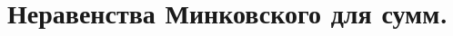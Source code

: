 \documentclass[../main.tex]{subfiles}
\begin{document}
\newpage
\section{Неравенства Минковского для сумм.}
\end{document}

